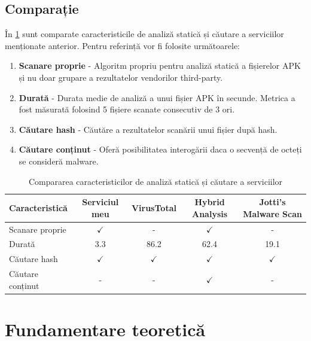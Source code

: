 \documentclass[12pt,a4paper]{report}
\begin{document}
\section{Comparație}
În \cref{tab:comparare_servicii} sunt comparate caracteristicile de analiză statică și căutare a serviciilor menționate anterior.
Pentru referință vor fi folosite următoarele:
\begin{enumerate}
      \item \textbf{Scanare proprie} - Algoritm propriu pentru analiză statică a fișierelor APK și nu doar grupare a rezultatelor vendorilor third-party.
      \item \textbf{Durată} - Durata medie de analiză a unui fișier APK în secunde. Metrica a fost măsurată folosind 5 fișiere scanate consecutiv de 3 ori.
      \item \textbf{Căutare hash} - Căutăre a rezultatelor scanării unui fișier după hash.
      \item \textbf{Căutare conținut} - Oferă posibilitatea interogării daca o secvență de octeți se consideră malware.
\end{enumerate}
\begin{table}[ht]
      \centering
      \begin{tabular}{lcccc}
            \toprule
            Caracteristică   & Serviciul meu & VirusTotal   & Hybrid Analysis & Jotti's Malware Scan \\
            \midrule
            Scanare proprie  & $\checkmark$  & -            & $\checkmark$    & -                    \\
            Durată           & 3.3           & 86.2         & 62.4            & 19.1                 \\
            Căutare hash     & $\checkmark$  & $\checkmark$ & $\checkmark$    & $\checkmark$         \\
            Căutare conținut & -             & -            & $\checkmark$    & -                    \\
            \bottomrule
      \end{tabular}
      \caption{Compararea caracteristicilor de analiză statică și căutare a serviciilor}
      \label{tab:comparare_servicii}
\end{table}

\chapter{Fundamentare teoretică}
\end{document}
